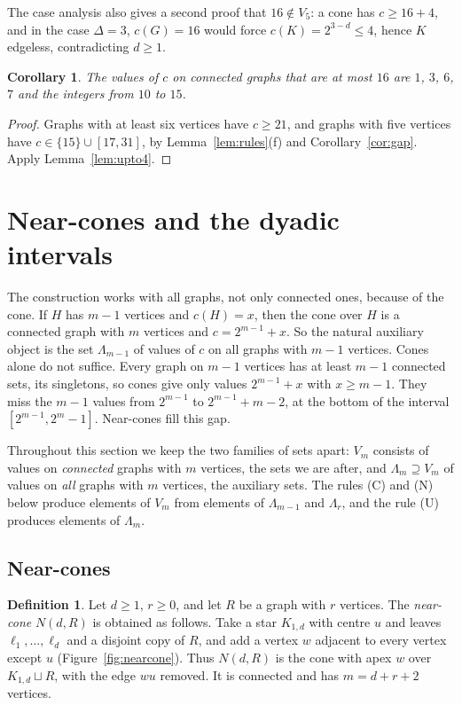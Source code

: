 \documentclass[11pt]{amsart}
\newtheorem{corollary}[theorem]{Corollary}
\theoremstyle{definition}
\newtheorem{definition}[theorem]{Definition}
\theoremstyle{remark}
\newcommand{\Lam}{\Lambda}
\begin{document}
The case analysis also gives a second proof that $16\notin V_5$: a cone has $c\ge16+4$, and in the case $\Delta=3$, $c(G)=16$ would force $c(K)=2^{3-d}\le4$, hence $K$ edgeless, contradicting $d\ge1$.

\begin{corollary}\label{cor:upto16}
The values of $c$ on connected graphs that are at most $16$ are $1$, $3$, $6$, $7$ and the integers from $10$ to $15$.
\end{corollary}

\begin{proof}
Graphs with at least six vertices have $c\ge21$, and graphs with five vertices have $c\in\{15\}\cup[17,31]$, by Lemma~\ref{lem:rules}(f) and Corollary~\ref{cor:gap}. Apply Lemma~\ref{lem:upto4}.
\end{proof}

\section{Near-cones and the dyadic intervals}\label{sec:large}

The construction works with all graphs, not only connected ones, because of the cone. If $H$ has $m-1$ vertices and $c(H)=x$, then the cone over $H$ is a connected graph with $m$ vertices and $c=2^{m-1}+x$. So the natural auxiliary object is the set $\Lam_{m-1}$ of values of $c$ on all graphs with $m-1$ vertices. Cones alone do not suffice. Every graph on $m-1$ vertices has at least $m-1$ connected sets, its singletons, so cones give only values $2^{m-1}+x$ with $x\ge m-1$. They miss the $m-1$ values from $2^{m-1}$ to $2^{m-1}+m-2$, at the bottom of the interval $[2^{m-1},2^m-1]$. Near-cones fill this gap.

Throughout this section we keep the two families of sets apart: $V_m$ consists of values on \emph{connected} graphs with $m$ vertices, the sets we are after, and $\Lam_m\supseteq V_m$ of values on \emph{all} graphs with $m$ vertices, the auxiliary sets. The rules (C) and (N) below produce elements of $V_m$ from elements of $\Lam_{m-1}$ and $\Lam_r$, and the rule (U) produces elements of $\Lam_m$.

\subsection{Near-cones}

\begin{definition}\label{def:nearcone}
Let $d\ge1$, $r\ge0$, and let $R$ be a graph with $r$ vertices. The \emph{near-cone} $N(d,R)$ is obtained as follows. Take a star $K_{1,d}$ with centre $u$ and leaves $\ell_1,\dots,\ell_d$ and a disjoint copy of $R$, and add a vertex $w$ adjacent to every vertex except $u$ (Figure~\ref{fig:nearcone}). Thus $N(d,R)$ is the cone with apex $w$ over $K_{1,d}\sqcup R$, with the edge $wu$ removed. It is connected and has $m=d+r+2$ vertices.
\end{definition}
\end{document}
